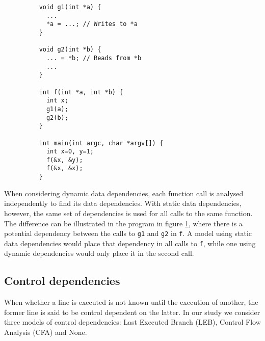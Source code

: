 \begin{figure}
  \centering
  \begin{verbatim}
    void g1(int *a) {
      ...
      *a = ...; // Writes to *a
    }
  
    void g2(int *b) {
      ... = *b; // Reads from *b
      ...
    }

    int f(int *a, int *b) {
      int x;
      g1(a);
      g2(b);
    }

    int main(int argc, char *argv[]) {
      int x=0, y=1;
      f(&x, &y);
      f(&x, &x);
    }
  \end{verbatim}
  \caption{}
  \label{datadeps}
\end{figure}

When considering dynamic data dependencies, each function call is analysed independently to find its data dependencies.
With static data dependencies, however, the same set of dependencies is used for all calls to the same function.
The difference can be illustrated in the program in figure \ref{datadeps}, where there is a potential dependency between the calls to \texttt{g1} and \texttt{g2} in \texttt{f}.
A model using static data dependencies would place that dependency in all calls to \texttt{f}, while one using dynamic dependencies would only place it in the second call.

\subsection{Control dependencies}
When whether a line is executed is not known until the execution of another, the former line is said to be control dependent on the latter.
In our study we consider three models of control dependencies: Last Executed Branch (LEB), Control Flow Analysis (CFA) and None.

